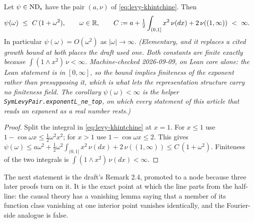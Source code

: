 \begin{lemma}
\label{lem:quadratic-growth}
\leanok
Let $\psi \in \mathrm{ND}_{\mathrm{s}}$ have the pair $(a,\nu)$ of \ref{eq:levy-khintchine}. Then
\[
  \psi(\omega) \ \le\ C\,(1 + \omega^2), \qquad \omega \in \mathbb{R},
  \qquad C := a + \tfrac12\int_{(0,1]} x^2\,\nu(dx) + 2\,\nu((1,\infty)) \ < \ \infty .
\]
In particular $\psi(\omega) = O(\omega^2)$ as $|\omega| \to \infty$.
\statusT\quad\emph{(Elementary, and it replaces a cited growth bound at both places the draft
used one. Both constants are finite exactly because $\int (1 \wedge x^2)\,\nu < \infty$.
Machine-checked 2026-09-09, on Lean core alone: the Lean statement is in $[0,\infty]$, so the
bound \emph{implies} finiteness of the exponent rather than presupposing it, which is what lets
the representation structure carry no finiteness field. The corollary
$\psi(\omega) < \infty$ is the helper \texttt{SymLevyPair.exponentL\_ne\_top}, on which every
statement of this article that reads an exponent as a real number rests.)}
\end{lemma}

\begin{proof}\leanok
Split the integral in \ref{eq:levy-khintchine} at $x = 1$. For $x \le 1$ use
$1 - \cos\omega x \le \tfrac12\omega^2x^2$; for $x > 1$ use $1 - \cos\omega x \le 2$. This
gives
$\psi(\omega) \le a\omega^2 + \tfrac12\omega^2\int_{(0,1]}x^2\,\nu(dx) + 2\,\nu((1,\infty))
\le C\,(1+\omega^2)$. Finiteness of the two integrals is
$\int (1 \wedge x^2)\,\nu(dx) < \infty$.
\end{proof}

The next statement is the draft's Remark 2.4, promoted to a node because three later proofs
turn on it. It is the exact point at which the line parts from the half-line: the causal
theory has a vanishing lemma saying that a member of its function class vanishing at one
interior point vanishes identically, and the Fourier-side analogue is false.

